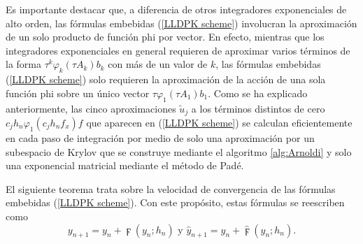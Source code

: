Es importante destacar que, a diferencia de otros integradores exponenciales de alto orden, las fórmulas embebidas (\ref{LLDPK scheme}) involucran la aproximación de un solo producto de función phi por  vector. En efecto, mientras que los integradores exponenciales en general requieren de aproximar varios términos de la forma $\tau^k \varphi_k(\tau A_k)b_k$ con más de un valor de $k$, las fórmulas embebidas (\ref{LLDPK scheme}) solo requieren la aproximación de la acción de una sola función phi sobre un único vector $\tau \varphi_1(\tau A_1)b_1$. Como se ha explicado anteriormente, las cinco aproximaciones $\widetilde{u}_j$ a los términos distintos de cero $c_jh_n\varphi_1(c_jh_nf_x)f$ que aparecen en (\ref{LLDPK scheme}) se calculan eficientemente en cada paso de integración por medio de solo una aproximación por un subespacio de Krylov que se construye mediante el algoritmo \ref{alg:Arnoldi} y solo una exponencial matricial mediante el método de Padé.

El siguiente teorema trata sobre la velocidad de convergencia de las fórmulas embebidas (\ref{LLDPK scheme}). Con este propósito, estas fórmulas se reescriben como
\begin{equation*}
    y_{n+1}=y_{n}+\digamma (y_{n};h_{n})\text{ \ \ \ \ y \ \ \ \ }\widehat{y}_{n+1}=y_{n}+\widehat{\digamma }(y_{n};h_{n}).
\end{equation*}


